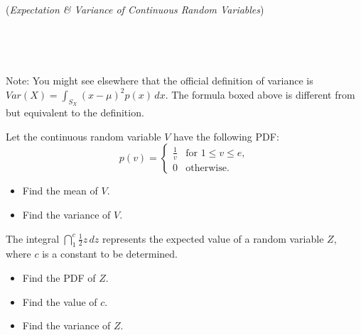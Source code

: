 \documentclass[10pt]{article}
\begin{document}
\hrulefill\\

\begin{center}
({\it Expectation \& Variance of Continuous Random Variables})
\end{center}

\,\hfill {} \hfill\,

\,\hfill {}\hfill\,

Note: You might see elsewhere that the official definition of variance is $Var(X)=\displaystyle\int_{S_X}(x-\mu)^2p(x)\,dx$. The formula boxed above is different from but equivalent to the definition.


\exercise{} Let the continuous random variable $V$ have the following PDF:
\[
p(v) = 
\begin{cases} 
\frac{1}{v} & \text{for } 1 \leq v \leq e, \\
0 & \text{otherwise}.
\end{cases}
\]

\begin{itemize}
\item[(a)] Find the mean of $V$.
    \vfill

\newpage%

\item[(b)] Find the variance of $V$.
    \vfill
    \vfill
    \vfill
\end{itemize}

\exercise{} The integral $\dint_1^{c} \frac12z\,dz$ represents the expected value of a random variable $Z$, where $c$ is a constant to be determined.\\

\begin{itemize}
\item[(a)] Find the PDF of $Z$.

\vfill
\item[(b)] Find the value of $c$.

    \vfill
    \vfill

\item[(c)] Find the variance of $Z$.

    \vfill
    \vfill

\end{itemize}
\end{document}
